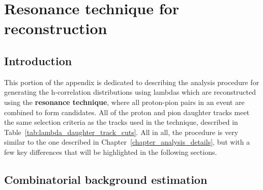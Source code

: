 \chapter{Resonance technique for \lmb reconstruction}
\label{appendix_resonance}

\section{Introduction}
This portion of the appendix is dedicated to describing the analysis procedure for generating the h-\lmb correlation distributions using lambdas which are reconstructed using the \textbf{resonance technique}, where all proton-pion pairs in an event are combined to form \lmb candidates. All of the proton and pion daughter tracks meet the same selection criteria as the tracks used in the \vz technique, described in Table~\ref{tab:lambda_daughter_track_cuts}. All in all, the procedure is very similar to the one described in Chapter~\ref{chapter_analysis_details}, but with a few key differences that will be highlighted in the following sections. 

\section{Combinatorial background estimation}
\label{sec:comb_background_res}

